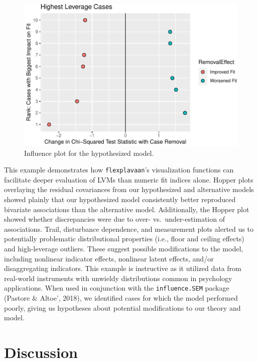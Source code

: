 \documentclass[
  english,
  man]{apa6}
\begin{document}
\begin{figure}

{\centering \includegraphics[width=0.6\linewidth]{flexplavaan_draft_files/figure-latex/influence-1} 

}

\caption{Influence plot for the hypothesized model.}\label{fig:influence}
\end{figure}

This example demonstrates how \texttt{flexplavaan}'s visualization functions can facilitate deeper evaluation of LVMs than numeric fit indices alone. Hopper plots overlaying the residual covariances from our hypothesized and alternative models showed plainly that our hypothesized model consistently better reproduced bivariate associations than the alternative model. Additionally, the Hopper plot showed whether discrepancies were due to over- vs.~under-estimation of associations. Trail, disturbance dependence, and measurement plots alerted us to potentially problematic distributional properties (i.e., floor and ceiling effects) and high-leverage outliers. These suggest possible modifications to the model, including nonlinear indicator effects, nonlinear latent effects, and/or disaggregating indicators. This example is instructive as it utilized data from real-world instruments with unwieldy distributions common in psychology applications. When used in conjunction with the \texttt{influence.SEM} package (Pastore \& Altoe', 2018), we identified cases for which the model performed poorly, giving us hypotheses about potential modifications to our theory and model.

\hypertarget{discussion}{%
\section{Discussion}\label{discussion}}
\end{document}
